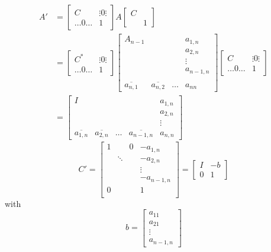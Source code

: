 \documentclass{article}
\numberwithin{lecref}{section}
\begin{document}
\begin{align*}  %
  A' &= \begin{bmatrix}
    C & \vdots 0 \vdots \\
    \ldots 0 \ldots & 1
  \end{bmatrix}
  A
  \begin{bmatrix}
    C & \\
    & 1
  \end{bmatrix} \\
  &= \begin{bmatrix}
    C^* & \vdots 0 \vdots \\
    \ldots 0 \ldots & 1
  \end{bmatrix} \begin{bmatrix}
    A_{n-1} & & & a_{1, n} \\
            & & & a_{2, n} \\
            & & & \vdots \\
            & & & a_{n-1,n} \\ \\
    \overline{a_{n,1}} & \overline{a_{n,2}} & \ldots & a_{nn}
  \end{bmatrix} \begin{bmatrix}
    C & \vdots 0 \vdots \\
    \ldots 0 \ldots & 1
  \end{bmatrix} \\
  &= \begin{bmatrix}
    I & & & & a_{1,n} \\
      & & & & a_{2,n} \\
      & & & & \vdots \\
    \overline{a_{1,n}} & \overline{a_{2,n}} & \ldots & \overline{a_{n-1,n}} & a_{n,n}
  \end{bmatrix}
\end{align*}
\[
  C' = \begin{bmatrix}
    1 &  & 0 & -a_{1,n} \\
      & \ddots &  & -a_{2,n} \\
      &        &  & \vdots \\
      &        &  & -a_{n-1,n} \\
    0 &        &  & 1 \\
  \end{bmatrix}
  = \left[
    \begin{array}{c|c}
      I & -b \\
      \hline
      0 & 1
    \end{array}
  \right]
\]
with
\[
  b = \begin{bmatrix} a_{11} \\ a_{21} \\ \vdots \\ a_{n-1,n} \end{bmatrix}
\]
\end{document}
